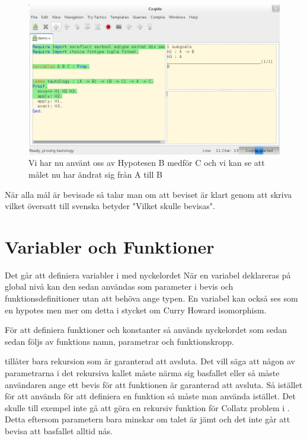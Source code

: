 \begin{figure}[H]
  \centering
  \includegraphics[width=150mm]{images/Proof_part3}
  \caption[Bevis i \coq IDE]
   {Vi har nu använt oss av Hypotesen B medför C och vi
    kan se att målet nu har ändrat sig från A till B}
\end{figure}

När alla mål är bevisade så talar man om att beviset är klart genom att skriva
 vilket översatt till svenska betyder "Vilket skulle bevisas".

\section{Variabler och Funktioner}

Det går att definiera variabler i \coq med nyckelordet  När en
variabel deklareras på global nivå kan den sedan användas som parameter i bevis
och funktionsdefinitioner utan att behöva ange typen. En variabel kan också ses
som en hypotes men mer om detta i stycket om Curry Howard isomorphism.

För att definiera funktioner och konstanter så används nyckelordet
 som sedan sedan följs av funktions namn, parametrar och
funktionskropp.

\coq tillåter bara rekursion som är garanterad att avsluta. Det vill säga att
någon av parametrarna i det rekursiva kallet måste närma sig basfallet eller så
måste användaren ange ett bevis för att funktionen är garanterad att avsluta.
Så istället för att använda  för att definiera en funktion så måste
man använda  istället. Det skulle till exempel inte gå att göra en
rekursiv funktion för Collatz problem i \coq. Detta eftersom parametern bara
minskar om talet är jämt och det inte går att bevisa att basfallet alltid nås.

